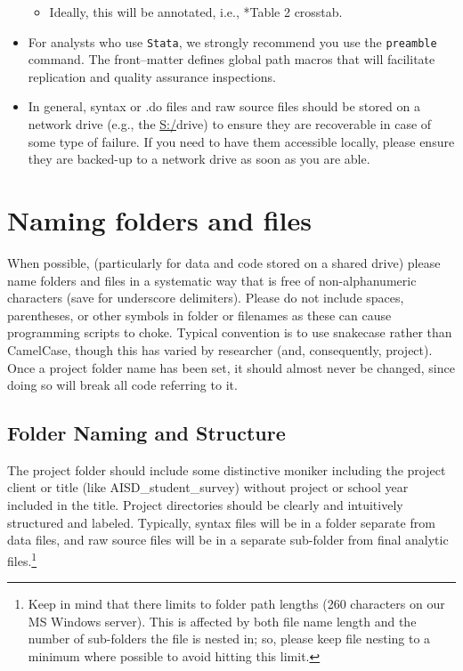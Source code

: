 \documentclass[11pt]{article}
\begin{document}
\begin{itemize}
	\begin{itemize}
		\item Ideally, this will be annotated, i.e., *Table 2 crosstab.
	\end{itemize}
\item For analysts who use \texttt{Stata}, we strongly recommend you use the \texttt{preamble} command. The front--matter defines global path macros that will facilitate replication and quality assurance inspections.
\item In general, syntax or .do files and raw source files should be stored on a network drive (e.g., the \url{S:/}drive) to ensure they are recoverable in case of some type of failure. If you need to have them accessible locally, please ensure they are backed-up to a network drive as soon as you are able.
\end{itemize}

\section{Naming folders and files} \label{sec:folders}
When possible, (particularly for data and code stored on a shared drive) please name folders and files in a systematic way that is free of non-alphanumeric characters (save for underscore delimiters). Please do not include spaces, parentheses, or other symbols in folder or filenames as these can cause programming scripts to choke. Typical convention is to use snake\textunderscore{}case rather than CamelCase, though this has varied by researcher (and, consequently, project). Once a project folder name has been set, it should almost never be changed, since doing so will break all code referring to it.

\subsection{Folder Naming and Structure}
The project folder should include some distinctive moniker including the project client or title (like AISD\_student\_survey) without project or school year included in the title. Project directories should be clearly and intuitively structured and labeled. Typically, syntax files will be in a folder separate from data files, and raw source files will be in a separate sub-folder from final analytic files.\footnote{Keep in mind that there limits to folder path lengths (260 characters on our \textsf{MS Windows} server). This is affected by both file name length and the number of sub-folders the file is nested in; so, please keep file nesting to a minimum where possible to avoid hitting this limit.}
\end{document}
